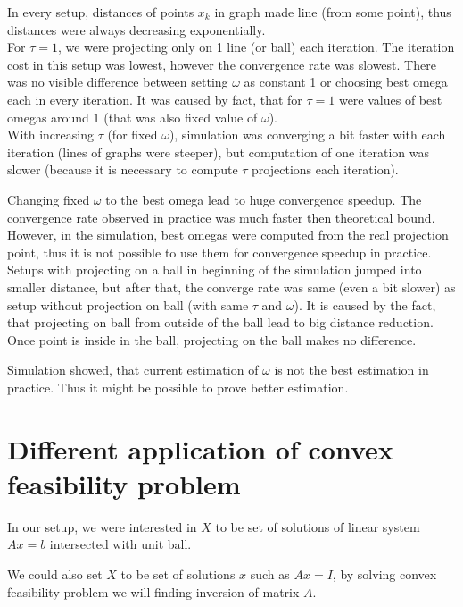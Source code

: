 \documentclass[11pt]{book}
\begin{document}
In every setup, distances of points $x_k$ in graph made line (from some point), thus distances were always decreasing exponentially.\\

For $\tau=1$, we were projecting only on 1 line (or ball) each iteration. The iteration cost in this setup was lowest, however the convergence rate was slowest. There was no visible difference between setting $\omega$ as constant 1 or choosing best omega each in every iteration. It was caused by fact, that for $\tau=1$ were values of best omegas around $1$ (that was also fixed value of $\omega$).\\

With increasing $\tau$ (for fixed $\omega$), simulation was converging a bit faster with each iteration (lines of graphs were steeper), but computation of one iteration was slower (because it is necessary to compute $\tau$ projections each iteration).

Changing fixed $\omega$ to the best omega lead to huge convergence speedup. The convergence rate observed in practice was much faster then theoretical bound. However, in the simulation, best omegas were computed from the real projection point, thus it is not possible to use them for convergence speedup in practice.\\

Setups with projecting on a ball in beginning of the simulation jumped into smaller distance, but after that, the converge rate was same (even a bit slower) as setup without projection on ball (with same $\tau$ and $\omega$). It is caused by the fact, that projecting on ball from outside of the ball lead to big distance reduction. Once point is inside in the ball, projecting on the ball makes no difference.

Simulation showed, that current estimation of $\omega$ is not the best estimation in practice. Thus it might be possible to prove better estimation.

\section{Different application of convex feasibility problem}

In our setup, we were interested in $X$ to be set of solutions of linear system $Ax=b$ intersected with unit ball.

We could also set $X$ to be set of solutions $x$ such as $Ax=I$, by solving convex feasibility problem we will finding inversion of matrix $A$.
\end{document}
